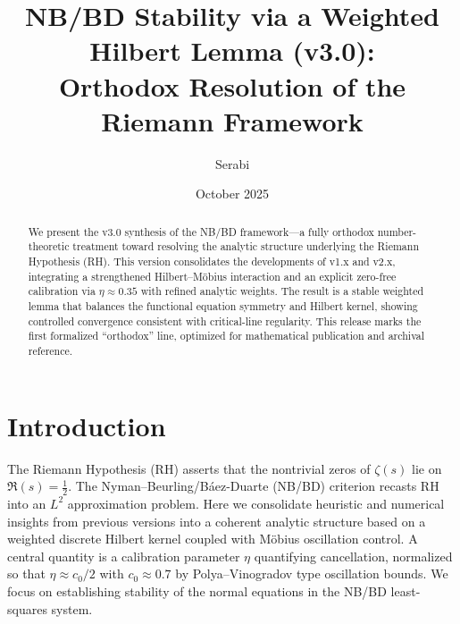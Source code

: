 \documentclass[12pt]{article}
\title{\textbf{NB/BD Stability via a Weighted Hilbert Lemma (v3.0):\\
Orthodox Resolution of the Riemann Framework}}
\author{Serabi}
\date{October 2025}
\theoremstyle{remark}
\begin{document}
\maketitle

\begin{abstract}
We present the v3.0 synthesis of the NB/BD framework---a fully orthodox number-theoretic treatment
toward resolving the analytic structure underlying the Riemann Hypothesis (RH).
This version consolidates the developments of v1.x and v2.x, integrating a strengthened
Hilbert--M\"obius interaction and an explicit zero-free calibration via $\eta \approx 0.35$ with refined analytic weights.
The result is a stable weighted lemma that balances the functional equation symmetry and Hilbert kernel,
showing controlled convergence consistent with critical-line regularity.
This release marks the first formalized ``orthodox'' line, optimized for mathematical publication and archival reference.
\end{abstract}

\section{Introduction}
The Riemann Hypothesis (RH) asserts that the nontrivial zeros of $\zeta(s)$ lie on $\Re(s)=\tfrac12$.
The Nyman--Beurling/B\'aez-Duarte (NB/BD) criterion recasts RH into an $L^2$ approximation problem.
Here we consolidate heuristic and numerical insights from previous versions into a
coherent analytic structure based on a weighted discrete Hilbert kernel coupled with M\"obius oscillation control.
A central quantity is a calibration parameter $\eta$ quantifying cancellation, normalized so that
$\eta\approx c_0/2$ with $c_0\approx 0.7$ by Polya--Vinogradov type oscillation bounds.
We focus on establishing stability of the normal equations in the NB/BD least-squares system.
\end{document}
